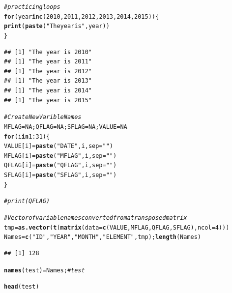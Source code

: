 \documentclass{article}\usepackage[]{graphicx}\usepackage[]{color}
\makeatletter
\newcommand{\hlnum}[1]{\textcolor[rgb]{0.686,0.059,0.569}{#1}}%
\newcommand{\hlstr}[1]{\textcolor[rgb]{0.192,0.494,0.8}{#1}}%
\newcommand{\hlcom}[1]{\textcolor[rgb]{0.678,0.584,0.686}{\textit{#1}}}%
\newcommand{\hlopt}[1]{\textcolor[rgb]{0,0,0}{#1}}%
\newcommand{\hlstd}[1]{\textcolor[rgb]{0.345,0.345,0.345}{#1}}%
\newcommand{\hlkwa}[1]{\textcolor[rgb]{0.161,0.373,0.58}{\textbf{#1}}}%
\newcommand{\hlkwb}[1]{\textcolor[rgb]{0.69,0.353,0.396}{#1}}%
\newcommand{\hlkwc}[1]{\textcolor[rgb]{0.333,0.667,0.333}{#1}}%
\newcommand{\hlkwd}[1]{\textcolor[rgb]{0.737,0.353,0.396}{\textbf{#1}}}%
\newenvironment{kframe}{%
 \def\at@end@of@kframe{}%
 \ifinner\ifhmode%
  \def\at@end@of@kframe{\end{minipage}}%
  \begin{minipage}{\columnwidth}%
 \fi\fi%
 \def\FrameCommand##1{\hskip\@totalleftmargin \hskip-\fboxsep
 \colorbox{shadecolor}{##1}\hskip-\fboxsep
     \hskip-\linewidth \hskip-\@totalleftmargin \hskip\columnwidth}%
 \MakeFramed {\advance\hsize-\width
   \@totalleftmargin\z@ \linewidth\hsize
   \@setminipage}}%
 {\par\unskip\endMakeFramed%
 \at@end@of@kframe}
\newenvironment{knitrout}{}{} %
\makeatother
\begin{document}
\begin{knitrout}
\color{fgcolor}\begin{kframe}
\begin{alltt}
\hlcom{# practicing loops}
\hlkwa{for} \hlstd{(year} \hlkwa{in} \hlkwd{c}\hlstd{(}\hlnum{2010}\hlstd{,}\hlnum{2011}\hlstd{,}\hlnum{2012}\hlstd{,}\hlnum{2013}\hlstd{,}\hlnum{2014}\hlstd{,}\hlnum{2015}\hlstd{))\{}
  \hlkwd{print}\hlstd{(}\hlkwd{paste}\hlstd{(}\hlstr{"The year is"}\hlstd{, year))}
\hlstd{\}}
\end{alltt}
\begin{verbatim}
## [1] "The year is 2010"
## [1] "The year is 2011"
## [1] "The year is 2012"
## [1] "The year is 2013"
## [1] "The year is 2014"
## [1] "The year is 2015"
\end{verbatim}
\begin{alltt}
\hlcom{# Create New Varible Names}
\hlstd{MFLAG}\hlkwb{=}\hlnum{NA}\hlstd{; QFLAG}\hlkwb{=}\hlnum{NA}\hlstd{; SFLAG}\hlkwb{=}\hlnum{NA}\hlstd{; VALUE}\hlkwb{=}\hlnum{NA}
\hlkwa{for} \hlstd{(i} \hlkwa{in} \hlnum{1}\hlopt{:}\hlnum{31}\hlstd{)\{}
\hlstd{VALUE[i]} \hlkwb{=} \hlkwd{paste}\hlstd{(}\hlstr{"DATE"}\hlstd{, i,} \hlkwc{sep}\hlstd{=}\hlstr{""}\hlstd{)}
\hlstd{MFLAG[i]} \hlkwb{=} \hlkwd{paste}\hlstd{(}\hlstr{"MFLAG"}\hlstd{, i,} \hlkwc{sep}\hlstd{=}\hlstr{""}\hlstd{)}
\hlstd{QFLAG[i]} \hlkwb{=} \hlkwd{paste}\hlstd{(}\hlstr{"QFLAG"}\hlstd{, i,} \hlkwc{sep}\hlstd{=}\hlstr{""}\hlstd{)}
\hlstd{SFLAG[i]} \hlkwb{=} \hlkwd{paste}\hlstd{(}\hlstr{"SFLAG"}\hlstd{, i,} \hlkwc{sep}\hlstd{=}\hlstr{""}\hlstd{)}
\hlstd{\}}

\hlcom{#print(QFLAG)}



\hlcom{# Vector of variable names converted from a transposed matrix}
\hlstd{tmp} \hlkwb{=} \hlkwd{as.vector}\hlstd{(}\hlkwd{t}\hlstd{(}\hlkwd{matrix}\hlstd{(}\hlkwc{data}\hlstd{=}\hlkwd{c}\hlstd{(VALUE, MFLAG, QFLAG, SFLAG),} \hlkwc{ncol}\hlstd{=}\hlnum{4}\hlstd{)))}
\hlstd{Names} \hlkwb{=} \hlkwd{c}\hlstd{(}\hlstr{"ID"}\hlstd{,} \hlstr{"YEAR"}\hlstd{,} \hlstr{"MONTH"}\hlstd{,} \hlstr{"ELEMENT"}\hlstd{, tmp);} \hlkwd{length}\hlstd{(Names)}
\end{alltt}
\begin{verbatim}
## [1] 128
\end{verbatim}
\begin{alltt}
\hlkwd{names}\hlstd{(test)}\hlkwb{=} \hlstd{Names;} \hlcom{#test}
\end{alltt}


{\ttfamily\noindent\bfseries\color{errorcolor}{\#\# Error in names(test) = Names: object 'test' not found}}\begin{alltt}
\hlkwd{head}\hlstd{(test)}
\end{alltt}


{\ttfamily\noindent\bfseries\color{errorcolor}{\#\# Error in head(test): object 'test' not found}}\end{kframe}
\end{knitrout}
\end{document}
